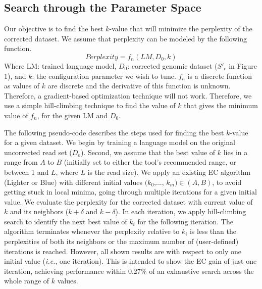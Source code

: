 \subsection{Search through the Parameter Space}
Our objective is to find the best $k$-value that will minimize the perplexity of the corrected dataset. We assume that perplexity can be modeled by the following function.
\begin{equation}
Perplexity = f_{n}(LM, D_0, k)
\end{equation} 
Where LM: trained language model, $D_0$: corrected genomic dataset ($S'_c$ in Figure 1), and $k$: the configuration parameter we wish to tune.
$f_{n}$ is a discrete function as values of $k$ are discrete and the derivative of this function is unknown. Therefore, a gradient-based optimization technique will not work. Therefore, we use a simple hill-climbing technique to find the value of $k$ that gives the minimum value of $f_n$, for the given LM and $D_0$.

The following pseudo-code describes the steps used for finding the best $k$-value for a given dataset. We begin by training a language model on the original uncorrected read set ($D_o$). Second, we assume that the best value of $k$ lies in a range from $A$ to $B$ (initially set to either the tool's recommended range, or between 1 and $L$, where $L$ is the read size).
We apply an existing EC algorithm (\eg Lighter or Blue) with different initial values $(k_{0}$,..., $k_{m}) \in (A, B)$, to avoid getting stuck in local minima, going through multiple iterations for a given initial value. We evaluate the perplexity for the corrected dataset with current value of $k$ and its neighbors ($k+\delta$ and $k-\delta$). In each iteration, we apply hill-climbing search to identify the next best value of $k_{i}$ for the following iteration. The algorithm terminates whenever the perplexity relative to $k_i$ is less than the perplexities of both its neighbors or the maximum number of (user-defined) iterations is reached. However, all shown results are with respect to only one initial value (\textit{i.e.}, one iteration). This is intended to show the EC gain of just one iteration, achieving performance within 0.27\% of an exhaustive search across the whole range of $k$ values. %



